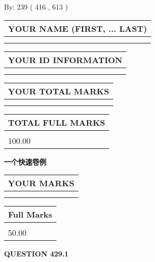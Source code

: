 \documentclass{ctexart}
\begin{document}
   
\hspace{1.0in} By: 
 239 ( 416 ,  613 )
   
   
   
   
\newpage 
\setcounter{page}{ 
   429001 } 
   
   
   
   
\noindent\begin{tabular}{|l|}
\hline
YOUR NAME (FIRST, ... LAST)  \\
\hline
 \\ 
 \\ 
\hline
\end{tabular}
\hspace{0.05in} \begin{tabular}{|l|}
\hline
 YOUR   ID   INFORMATION  \\
\hline
 \\ 
 \\ 
\hline
\end{tabular}
   
   
\vspace{0.2in}\noindent\begin{tabular}{|l|}
\hline
YOUR TOTAL MARKS  \\
\hline
 \\ 
 \\ 
\hline
\end{tabular}
\hspace{0.05in} \begin{tabular}{|l|}
\hline
TOTAL FULL MARKS  \\
\hline
 \\ 
100.00 \\
\hline
\end{tabular}
   
   
 \vspace{0.2in}
{\LARGE {\textbf{ 一个快速卷例}}}
   
   
  
\vspace{0.2in}
  
\noindent\begin{tabular}{|l|}
\hline
 YOUR MARKS  \\
\hline
 \\ 
 \\ 
\hline
\end{tabular}
\hspace{0.05in} \begin{tabular}{|l|}
\hline
 Full Marks  \\
\hline
 \\ 
50.00 \\
\hline
\end{tabular}
{\textbf{\Large{QUESTION
429.1 
}}}
  
\end{document}
